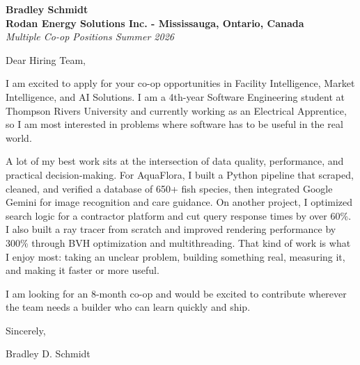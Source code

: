 \documentclass[11pt]{article}
\begin{document}
\textbf{Bradley Schmidt}\\
\vspace{0.5em}
\textbf{Rodan Energy Solutions Inc. - Mississauga, Ontario, Canada}\\
\textit{Multiple Co-op Positions Summer 2026}

Dear Hiring Team,

\par

I am excited to apply for your co-op opportunities in Facility Intelligence, Market Intelligence, and AI Solutions. I am a 4th-year Software Engineering student at Thompson Rivers University and currently working as an Electrical Apprentice, so I am most interested in problems where software has to be useful in the real world.

\par

A lot of my best work sits at the intersection of data quality, performance, and practical decision-making. For AquaFlora, I built a Python pipeline that scraped, cleaned, and verified a database of 650+ fish species, then integrated Google Gemini for image recognition and care guidance. On another project, I optimized search logic for a contractor platform and cut query response times by over 60\%. I also built a ray tracer from scratch and improved rendering performance by 300\% through BVH optimization and multithreading. That kind of work is what I enjoy most: taking an unclear problem, building something real, measuring it, and making it faster or more useful.

\par

I am looking for an 8-month co-op and would be excited to contribute wherever the team needs a builder who can learn quickly and ship.

\par

Sincerely,

\par

Bradley D. Schmidt
\end{document}
